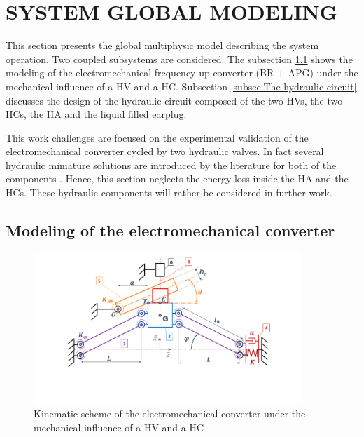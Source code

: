 \documentclass[3p,twocolumn,preprint]{elsarticle}
\begin{document}
\section{SYSTEM GLOBAL MODELING}
\label{sec:SYSTEM MODELING}
This section presents the global multiphysic model describing the system operation. Two coupled subsystems are considered. The subsection \ref{subsec:The electromechanical converter} shows the modeling of the electromechanical frequency-up converter (BR + APG) under the mechanical influence of a HV and a HC. Subsection \ref{subsec:The hydraulic circuit} discusses the design of the hydraulic circuit composed of the two HVs, the two HCs, the HA and the liquid filled earplug.

This work challenges are focused on the experimental validation of the electromechanical converter cycled by two hydraulic valves. In fact several hydraulic miniature solutions are introduced by the literature for both of the components \cite{Wang2020,Xu2021,Zhu2013}. Hence, this section neglects the energy loss inside the HA and the HCs. These hydraulic components will rather be considered in further work. 

	\subsection{Modeling of the electromechanical converter}	
	\label{subsec:The electromechanical converter}
\begin{figure}[!htbp]
	\centering
	\captionsetup{justification=centering}
	\includegraphics[trim={0cm 0cm 0cm 0cm},clip, width=0.9\textwidth]{figures/schema_cinematique1.pdf}
	\caption{Kinematic scheme of the electromechanical converter under the mechanical influence of a HV and a HC}
	\label{fig:schema_cinematique1}
\end{figure}
\end{document}
